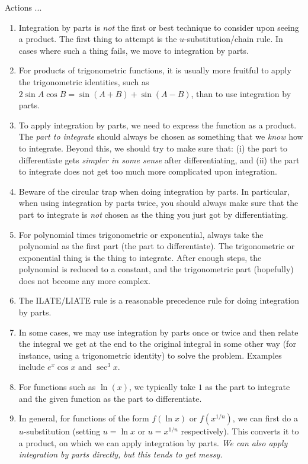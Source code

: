 \documentclass[10pt]{amsart}
\begin{document}
Actions ...

\begin{enumerate}

\item Integration by parts is {\em not} the first or best technique to
  consider upon seeing a product. The first thing to attempt is the
  $u$-substitution/chain rule. In cases where such a thing fails, we
  move to integration by parts.
\item For products of trigonometric functions, it is usually more
  fruitful to apply the trigonometric identities, such as $2\sin A
  \cos B = \sin(A + B) + \sin(A - B)$, than to use integration by
  parts.
\item To apply integration by parts, we need to express the function
  as a product. The {\em part to integrate} should always be chosen as
  something that we {\em know} how to integrate. Beyond this, we
  should try to make sure that: (i) the part to differentiate gets
  {\em simpler in some sense} after differentiating, and (ii) the part
  to integrate does not get too much more complicated upon
  integration.
\item Beware of the circular trap when doing integration by parts. In
  particular, when using integration by parts twice, you should always
  make sure that the part to integrate is {\em not} chosen as the
  thing you just got by differentiating.
\item For polynomial times trigonometric or exponential, always take
  the polynomial as the first part (the part to differentiate). The
  trigonometric or exponential thing is the thing to integrate. After
  enough steps, the polynomial is reduced to a constant, and the
  trigonometric part (hopefully) does not become any more complex.
\item The ILATE/LIATE rule is a reasonable precedence rule for doing
  integration by parts.
\item In some cases, we may use integration by parts once or twice and
  then relate the integral we get at the end to the original integral
  in some other way (for instance, using a trigonometric identity) to
  solve the problem. Examples include $e^x \cos x$ and $\sec^3 x$.
\item For functions such as $\ln (x)$, we typically take $1$ as the
  part to integrate and the given function as the part to
  differentiate.
\item In general, for functions of the form $f(\ln x)$ or
  $f(x^{1/n})$, we can first do a $u$-substitution (setting $u = \ln
  x$ or $u = x^{1/n}$ respectively). This converts it to a product, on
  which we can apply integration by parts. {\em We can also apply
  integration by parts directly, but this tends to get messy.}
\end{enumerate}
\end{document}
